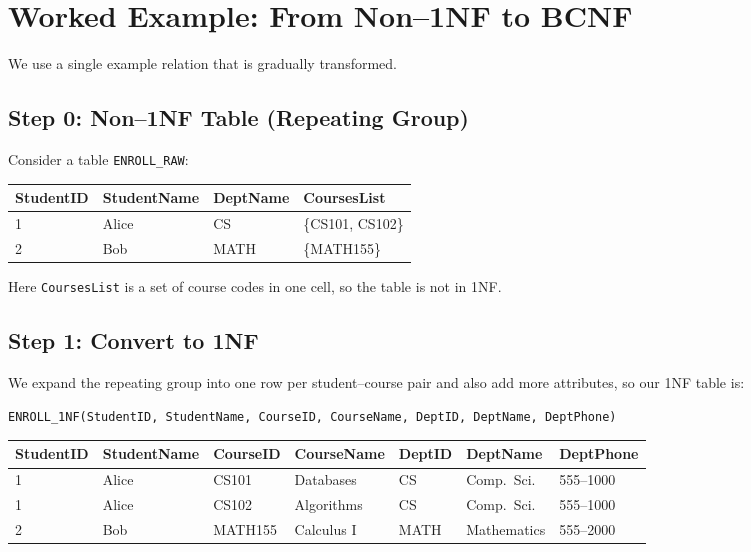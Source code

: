 \documentclass{article}
\begin{document}
\clearpage
\section*{Worked Example: From Non--1NF to BCNF}

We use a single example relation that is gradually transformed.

\subsection*{Step 0: Non--1NF Table (Repeating Group)}

Consider a table \texttt{ENROLL\_RAW}:

\begin{center}
\begin{tabular}{llll}
\toprule
StudentID & StudentName & DeptName & CoursesList \\
\midrule
1 & Alice & CS   & \{CS101, CS102\} \\
2 & Bob   & MATH & \{MATH155\} \\
\bottomrule
\end{tabular}
\end{center}

Here \texttt{CoursesList} is a set of course codes in one cell, so the table
is not in 1NF.

\bigskip

\subsection*{Step 1: Convert to 1NF}

We expand the repeating group into one row per student--course pair and
also add more attributes, so our 1NF table is:

\begin{center}
\texttt{ENROLL\_1NF(StudentID, StudentName, CourseID, CourseName, DeptID, DeptName, DeptPhone)}
\end{center}

\begin{center}
\begin{tabular}{lllllll}
\toprule
StudentID & StudentName & CourseID & CourseName & DeptID & DeptName & DeptPhone \\
\midrule
1 & Alice & CS101  & Databases    & CS   & Comp.~Sci. & 555--1000 \\
1 & Alice & CS102  & Algorithms   & CS   & Comp.~Sci. & 555--1000 \\
2 & Bob   & MATH155 & Calculus I  & MATH & Mathematics & 555--2000 \\
\bottomrule
\end{tabular}
\end{center}
\end{document}
